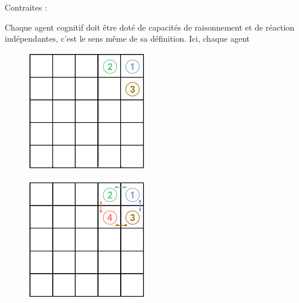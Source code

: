 \documentclass[a4paper, 12pt, french]{article}
\begin{document}
Contraites :

Chaque agent cognitif doit être doté de capacités de raisonnement et de réaction indépendantes, c'est le sens même de sa définition. Ici, chaque agent

\begin{figure}[h]
	\centering
	\includegraphics[width=200px]{images/3_agents.png}
\end{figure}

\begin{figure}[h]
	\centering
	\includegraphics[width=200px]{images/4_agents.png}
\end{figure}
\end{document}
